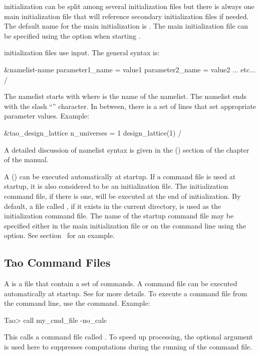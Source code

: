 \documentclass{hitec}     %
\begin{document}
\tao initialization can be split among several initialization files but there is always one main
initialization file that will reference secondary initialization files if needed. The default name
for the main initialization is . The main initialization file can be specified using
the  option when starting \tao.

\tao initialization files use  input. The general syntax is:
\begin{code}
&namelist-name
  parameter1_name = value1
  parameter2_name = value2
  ... etc...
/
\end{code}
The namelist starts with  where  is the name of the
namelist. The namelist ends with the slash ``\vn{/}'' character. In between, there is a set of lines
that set appropriate parameter values. Example:
\begin{code}
&tao_design_lattice
  n_universes = 1
  design_lattice(1)%
/
\end{code}
A detailed discussion of namelist syntax is given in the  ()
section of the  chapter of the \tao manual.

A  () can be executed automatically at startup. If a command file
is used at startup, it is also considered to be an initialization file. The initialization command
file, if there is one, will be executed at the end of initialization.  By default, a file called
, if it exists in the current directory, is used as the initialization command
file. The name of the startup command file may be specified either in the main initialization file
or on the command line using the  option. See section~ for an example.

\subsection{Tao Command Files}
\label{s:cmd.file}

A  is a file that contain a set of \tao commands. A command file can be executed
automatically at startup. See  for more details. To execute a command file from
the \tao command line, use the  command. Example:
\begin{code}
Tao> call my_cmd_file -no_calc
\end{code}
This calls a command file called . To speed up processing, the 
optional argument is used here to suppresses computations during the running of the command file.
\end{document}
